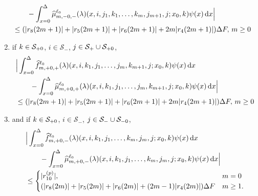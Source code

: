 \begin{cor}
\begin{enumerate}
\begin{align}
                	\\&\qquad{} -\int_{x=0}^\Delta \widehat \mu_{m,-0,-}^{\ell_0}(\lambda)(x,i,j_1,k_1,\dots,k_m,j_{m+1},j;x_0,k)\psi(x)\, \mathrm{d} x\Big|\nonumber 
	\\&\leq   (|r_8(2m+1)|+|r_5(2m+1)|+|r_6(2m+1)| + 2m|r_4(2m+1)|)\Delta F,\,  m \geq 0   \label{eqn: MMv22}
	\end{align}
	\item {if \(k\in\mathcal{S}_{+0}\), \(i\in\mathcal S_-\), \(j\in\mathcal{S}_+\cup\mathcal{S}_{+0}\),}
	\begin{align}
                	&\Big|\int_{x=0}^\Delta \widehat{f}_{m,+0,+}^{\ell_0}(\lambda)(x,i,k_1,j_1,\dots,j_m,k_{m+1},j;x_0,k)\psi(x) \, \mathrm{d} x \nonumber 
                	\\&\qquad{} - \int_{x=0}^\Delta \widehat \mu_{m,+0,+}^{\ell_0}(\lambda)(x,i,k_1,j_1,\dots,j_m,k_{m+1},j;x_0,k)\psi(x) \, \mathrm{d} x\Big| \nonumber 
	\\&\leq   (|r_8(2m+1)|+|r_5(2m+1)|+|r_6(2m+1)| + 2m|r_4(2m+1)|)\Delta F,\,  m \geq 0   \label{eqn: MMv222}
	\end{align}
	\item {and if \(k\in\mathcal{S}_{+0}\), \(i\in\mathcal S_-\), \(j\in\mathcal{S}_-\cup\mathcal{S}_{-0}\),}
	\begin{align}
                	&\Big|\int_{x=0}^\Delta \widehat{f}_{m,+0,-}^{\ell_0}(\lambda)(x,i,k_1,j_1,\dots,k_{m},j_{m},j;x_0,k)\psi(x) \, \mathrm{d} x\nonumber 
                	\\&\qquad{}-\int_{x=0}^\Delta \widehat{\mu}_{m,+0,-}^{\ell_0}(\lambda)(x,i,k_1,j_1,\dots,k_{m},j_{m},j;x_0,k)\psi(x)\, \mathrm{d} x\Big| \nonumber 
	\\&\leq \begin{cases}  |r_{10}^{(p)}|, & m=0 \\( |r_8(2m)|+|r_5(2m)|+|r_6(2m)| + (2m-1)|r_4(2m)|)\Delta F & m \geq 1. \end{cases}\label{eqn: MMv2}
	\end{align}
	\end{enumerate}
\end{cor}
